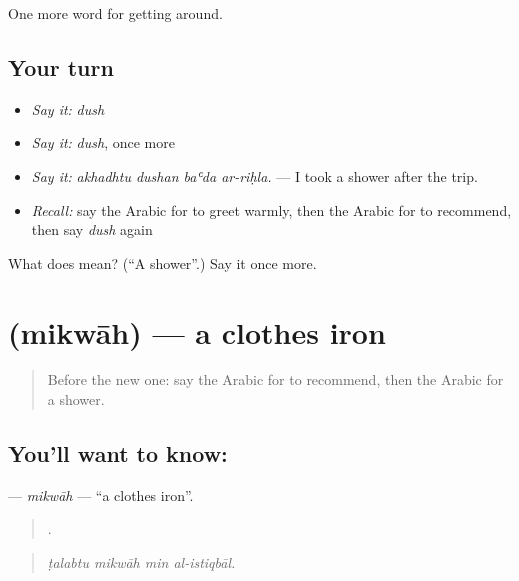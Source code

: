 \begin{grammarlens}[title={What you've built}]
One more word for getting around.
\end{grammarlens}

\subsection*{Your turn}
\begin{itemize}
\raggedright
  \item \emph{Say it:} \emph{dush}
  \item \emph{Say it:} \emph{dush}, once more
  \item \emph{Say it:} \emph{akhadhtu dushan baʿda ar-riḥla.} — I took a shower after the trip.
  \item \emph{Recall:} say the Arabic for to greet warmly, then the Arabic for to recommend, then say \emph{dush} again
\end{itemize}

\begin{tcolorbox}[breakable,colback=teal!4,colframe=teal!35!black,title={Before you move on}]
What does  mean? (\textquotedblleft{}A shower\textquotedblright{}.) Say it once more.
\end{tcolorbox}
\section[\texorpdfstring{\ar{مكواة} (mikwāh)}{مكواة (mikwāh)}]{ (mikwāh) — a clothes iron}

\label{lesson:AR-C447-mikwah}



\begin{quote}
Before the new one: say the Arabic for to recommend, then the Arabic for a shower.
\end{quote}

\subsection*{You'll want to know: }
\textbf{} — \emph{mikwāh} — \textquotedblleft{}a clothes iron\textquotedblright{}.

\begin{quote}
   .
\end{quote}

\begin{quote}
\emph{ṭalabtu mikwāh min al-istiqbāl.}
\end{quote}

